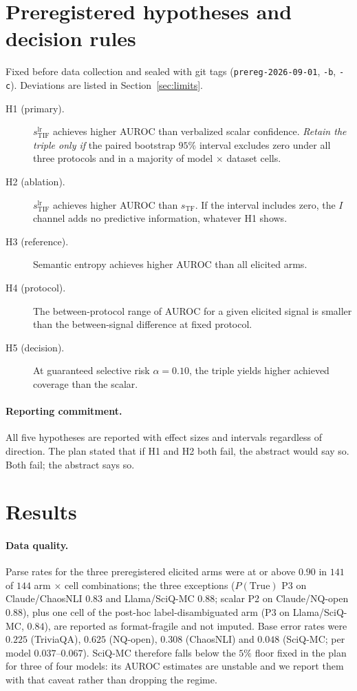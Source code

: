 \documentclass[11pt]{article}
\begin{document}
\section{Preregistered hypotheses and decision rules}
\label{sec:prereg}

Fixed before data collection and sealed with git tags (\texttt{prereg-2026-09-01}, \texttt{-b},
\texttt{-c}). Deviations are listed in Section~\ref{sec:limits}.

\begin{description}
  \item[H1 (primary).] $s_{\mathrm{TIF}}^{\mathrm{lr}}$ achieves higher AUROC than verbalized
        scalar confidence. \emph{Retain the triple only if} the paired bootstrap $95\%$ interval
        excludes zero under all three protocols and in a majority of model $\times$ dataset cells.
  \item[H2 (ablation).] $s_{\mathrm{TIF}}^{\mathrm{lr}}$ achieves higher AUROC than
        $s_{\mathrm{TF}}$. If the interval includes zero, the $I$ channel adds no predictive
        information, whatever H1 shows.
  \item[H3 (reference).] Semantic entropy achieves higher AUROC than all elicited arms.
  \item[H4 (protocol).] The between-protocol range of AUROC for a given elicited signal is
        smaller than the between-signal difference at fixed protocol.
  \item[H5 (decision).] At guaranteed selective risk $\alpha=0.10$, the triple yields higher
        achieved coverage than the scalar.
\end{description}

\paragraph{Reporting commitment.} All five hypotheses are reported with effect sizes and
intervals regardless of direction. The plan stated that if H1 and H2 both fail, the abstract
would say so. Both fail; the abstract says so.

\section{Results}
\label{sec:results}

\paragraph{Data quality.} Parse rates for the three preregistered elicited arms were at or
above $0.90$ in $141$ of $144$ arm $\times$ cell combinations; the three exceptions
($P(\text{True})$ P3 on Claude/ChaosNLI $0.83$ and Llama/SciQ-MC $0.88$; scalar P2 on
Claude/NQ-open $0.88$), plus one cell of the post-hoc label-disambiguated arm (P3 on
Llama/SciQ-MC, $0.84$), are reported as format-fragile and not imputed. Base error rates were $0.225$ (TriviaQA), $0.625$ (NQ-open), $0.308$ (ChaosNLI) and
$0.048$ (SciQ-MC; per model $0.037$--$0.067$). SciQ-MC therefore falls below the $5\%$ floor
fixed in the plan for three of four models: its AUROC estimates are unstable and we report them
with that caveat rather than dropping the regime.
\end{document}
